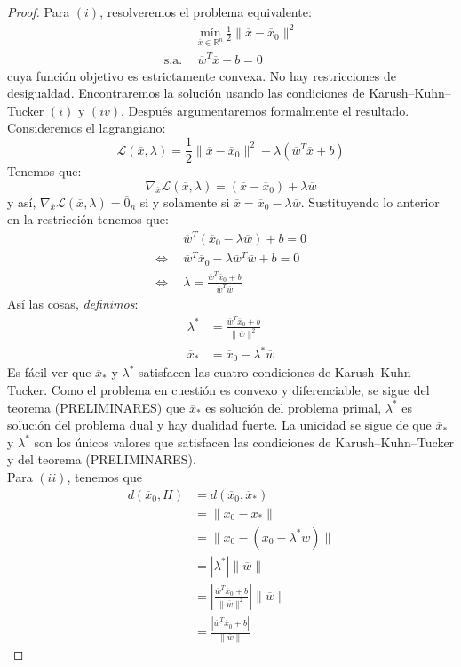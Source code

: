 \documentclass[11pt]{article}
\newcommand{\R}{\mathbb{R}}
\newcommand{\Rn}{\R^{n}}
\newcommand{\wv}{\overline{w}}
\newcommand{\x}{\overline{x}}
\newcommand{\xz}{\overline{x}_{0}}
\newcommand{\z}{\overline{0}_{n}}
\newcommand{\La}{\mathcal{L}}
\newcommand{\xo}{\overline{x}_{*}}
\newcommand{\nw}{\|\wv\|}
\begin{document}
\begin{proof}
Para $(i)$, resolveremos el problema equivalente:
\begin{equation*}
\begin{aligned}
& \underset{\x\in \Rn}{\text{mín}}\ \frac{1}{2} \|\x-\xz\|^{2} \\
\text{s.a.}\ \
& \wv^{T}\x+b=0
\end{aligned}
\end{equation*}
cuya función objetivo es estrictamente convexa. No hay restricciones de desigualdad. Encontraremos la solución usando las condiciones de Karush--Kuhn--Tucker $(i)$ y $(iv)$. Después argumentaremos formalmente el resultado.\\
Consideremos el lagrangiano:
$$\La(\x, \lambda)=\frac{1}{2}\|\x-\xz\|^{2}+\lambda(\wv^{T}\x+b)$$
Tenemos que:
$$\nabla_{\x}\La(\x, \lambda)=(\x-\xz)+\lambda\wv$$
y así, $\nabla_{\x}\La(\x, \lambda)=\z$ si y solamente si $\x=\xz-\lambda\wv$. Sustituyendo lo anterior en la restricción tenemos que:
\begin{equation*}
\begin{aligned}
&\wv^{T}(\xz-\lambda\wv)+b=0 \\
\Leftrightarrow\ \ &\wv^{T}\xz-\lambda\wv^{T}\wv+b=0 \\
\Leftrightarrow\ \ &\lambda=\frac{\wv^{T}\xz+b}{\wv^{T}\wv}
\end{aligned}
\end{equation*}
Así las cosas, \emph{definimos}:
\begin{equation*}
\begin{aligned}
\lambda^{*}&=\frac{\wv^{T}\xz+b}{\nw^{2}}\\
\xo&=\xz-\lambda^{*}\wv
\end{aligned}
\end{equation*}
Es fácil ver que $\xo$ y $\lambda^{*}$ satisfacen las cuatro condiciones de Karush--Kuhn--Tucker. Como el problema en cuestión es convexo y diferenciable, se sigue del teorema (PRELIMINARES) que $\xo$ es solución del problema primal, $\lambda^{*}$ es solución del problema dual y hay dualidad fuerte. La unicidad se sigue de que $\xo$ y $\lambda^{*}$ son los únicos valores que satisfacen las condiciones de Karush--Kuhn--Tucker y del teorema (PRELIMINARES).\\
Para $(ii)$, tenemos que
\begin{equation*}
\begin{aligned}
d(\xz, H)&=d(\xz, \xo) \\%
&=\|\xz-\xo\| \\%
&=\|\xz-(\xz-\lambda^{*}\wv)\| \\%
&=|\lambda^{*}|\nw \\
&=\left|\frac{\wv^{T}\xz+b}{\nw^{2}}\right| \nw\\
&=\frac{|\wv^{T}\xz+b|}{\nw}
\end{aligned}
\end{equation*}
\end{proof}
\end{document}
